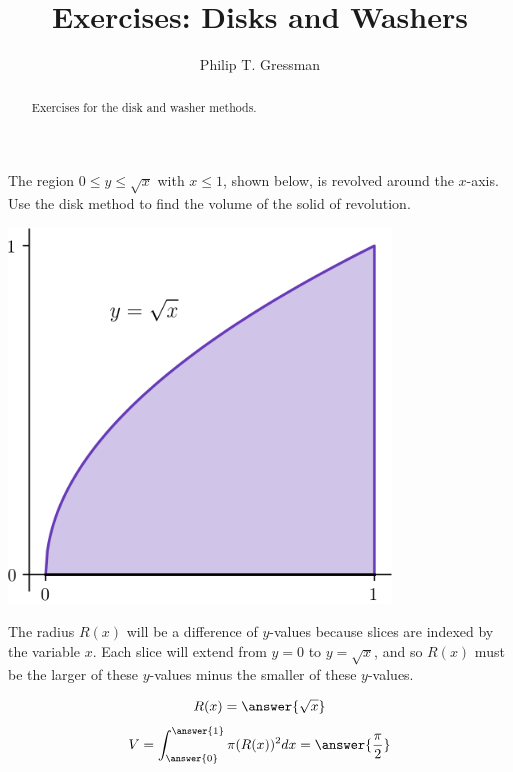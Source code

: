 \documentclass{ximera}
\title{Exercises: Disks and Washers}
\author{Philip T. Gressman}
\begin{document}
\begin{abstract}
Exercises for the disk and washer methods.
\end{abstract}
\maketitle

\begin{problem}
The region $0 \leq y \leq \sqrt{x}$ with $x \leq 1$, shown below, is revolved around the $x$-axis. Use the disk method to find the volume of the solid of revolution.
\begin{center}
\begin{image}
\includegraphics[width=4in]{diskwasher/disk01.png}
\end{image}
\end{center}
\begin{hint}
The radius $R(x)$ will be a difference of $y$-values because slices are indexed by the variable $x$.
Each slice will extend from $y=0$ to $y =  \sqrt{x}$, and so $R(x)$ must be the larger of these $y$-values minus the smaller of these $y$-values.
\end{hint}
\begin{prompt}
\[ R(x) = \answer{\sqrt{x}} \]
\[ V = \int_{\answer{0}}^{\answer{1}} \pi (R(x))^2 dx =  \answer{\frac{\pi}{2}} \]
\end{prompt}
\end{problem}
\end{document}

